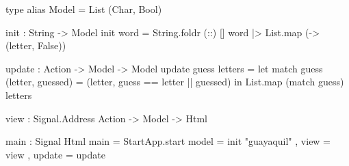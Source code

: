 \documentclass[spanish]{beamer}
\begin{document}

\begin{frame}[fragile]

  \begin{code}
type alias Model =
  List (Char, Bool)
  \end{code}
\end{frame}


\begin{frame}[fragile]

  \begin{code}
init : String -> Model
init word =
  String.foldr (::) [] word
    |> List.map ( -> (letter, False))
  \end{code}
\end{frame}


\begin{frame}[fragile]

  \begin{code}
update : Action -> Model -> Model
update guess letters =
  let
    match guess (letter, guessed) =
      (letter, guess == letter || guessed)
  in
    List.map (match guess) letters
  \end{code}
\end{frame}


\begin{frame}[fragile]

  \begin{code}
view : Signal.Address Action -> Model -> Html
  \end{code}
\end{frame}


\begin{frame}[fragile]

  \begin{code}
main : Signal Html
main =
  StartApp.start
    { model = init "guayaquil"
    , view = view
    , update = update
    }
  \end{code}
\end{frame}

\end{document}
